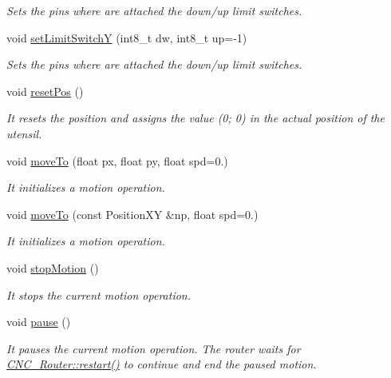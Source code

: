 \begin{DoxyCompactItemize}
\begin{DoxyCompactList}\small\item\em Sets the pins where are attached the down/up limit switches. \end{DoxyCompactList}\item 
void \hyperlink{class_c_n_c___router_af9308de7c3273a4f7dc18bc3cfe617d4}{set\+Limit\+Switch\+Y} (int8\+\_\+t dw, int8\+\_\+t up=-\/1)
\begin{DoxyCompactList}\small\item\em Sets the pins where are attached the down/up limit switches. \end{DoxyCompactList}\item 
void \hyperlink{class_c_n_c___router_a30d838430b7452a8f47071d2f6b8845e}{reset\+Pos} ()
\begin{DoxyCompactList}\small\item\em It resets the position and assigns the value (0; 0) in the actual position of the utensil. \end{DoxyCompactList}\item 
void \hyperlink{class_c_n_c___router_a9630faad381924b8f3252e100345274e}{move\+To} (float px, float py, float spd=0.)
\begin{DoxyCompactList}\small\item\em It initializes a motion operation. \end{DoxyCompactList}\item 
void \hyperlink{class_c_n_c___router_a7eb9a8553f02ba626abbc32f98663759}{move\+To} (const Position\+X\+Y \&np, float spd=0.)
\begin{DoxyCompactList}\small\item\em It initializes a motion operation. \end{DoxyCompactList}\item 
void \hyperlink{class_c_n_c___router_aebacab02935c41a4c11b926c0770bcac}{stop\+Motion} ()
\begin{DoxyCompactList}\small\item\em It stops the current motion operation. \end{DoxyCompactList}\item 
void \hyperlink{class_c_n_c___router_a6b5ad1a227e63d3f374e0e53f3cf047c}{pause} ()
\begin{DoxyCompactList}\small\item\em It pauses the current motion operation. The router waits for \hyperlink{class_c_n_c___router_ab36f29523c76dd9f64c1ab5367c8f3d3}{C\+N\+C\+\_\+\+Router\+::restart()} to continue and end the paused motion. \end{DoxyCompactList}\item 

\end{DoxyCompactItemize}
